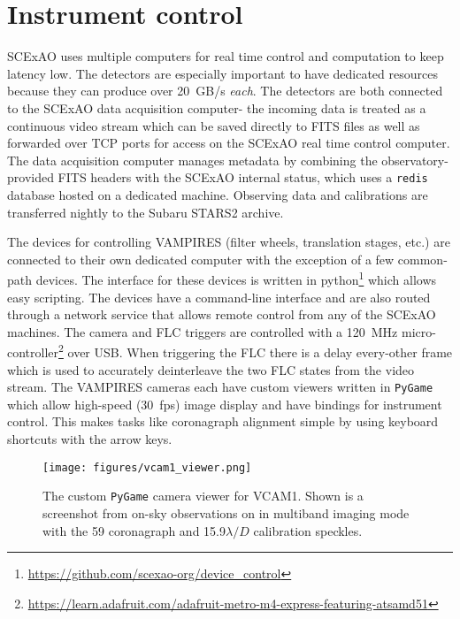 \section{Instrument control}\label{sec:control}

SCExAO uses multiple computers for real time control and computation to keep latency low. The detectors are especially important to have dedicated resources because they can produce over \SI{20}{GB/s} \textit{each}. The detectors are both connected to the SCExAO data acquisition computer- the incoming data is treated as a continuous video stream which can be saved directly to FITS files as well as forwarded over TCP ports for access on the SCExAO real time control computer. The data acquisition computer manages metadata by combining the observatory-provided FITS headers with the SCExAO internal status, which uses a \texttt{redis} database hosted on a dedicated machine. Observing data and calibrations are transferred nightly to the Subaru STARS2 archive.

The devices for controlling VAMPIRES (filter wheels, translation stages, etc.) are connected to their own dedicated computer with the exception of a few common-path devices. The interface for these devices is written in python\footnote{\url{https://github.com/scexao-org/device_control}} which allows easy scripting. The devices have a command-line interface and are also routed through a network service that allows remote control from any of the SCExAO machines. The camera and FLC triggers are controlled with a \SI{120}{\mega\hertz} micro-controller\footnote{\url{https://learn.adafruit.com/adafruit-metro-m4-express-featuring-atsamd51}} over USB. When triggering the FLC there is a delay every-other frame which is used to accurately deinterleave the two FLC states from the video stream. The VAMPIRES cameras each have custom viewers written in \texttt{PyGame} which allow high-speed (\SI{30}{fps}) image display and have bindings for instrument control. This makes tasks like coronagraph alignment simple by using keyboard shortcuts with the arrow keys.

\begin{figure}
    \centering
    \texttt{[image: figures/vcam1\_viewer.png]}
    \caption{The custom \texttt{PyGame} camera viewer for VCAM1. Shown is a screenshot from on-sky observations on  in multiband imaging mode with the \SI{59}{\mas} coronagraph and 15.9$\lambda/D$ calibration speckles.}
    \label{fig:vcam1}
\end{figure}
